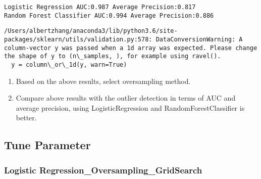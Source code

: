 \documentclass[11pt]{article}
\providecommand{\tightlist}{%
      \setlength{\itemsep}{0pt}\setlength{\parskip}{0pt}}
\begin{document}
    \begin{Verbatim}[commandchars=\\\{\}]
Logistic Regression AUC:0.987 Average Precision:0.817
Random Forest Classifier AUC:0.994 Average Precision:0.886

    \end{Verbatim}

    \begin{Verbatim}[commandchars=\\\{\}]
/Users/albertzhang/anaconda3/lib/python3.6/site-packages/sklearn/utils/validation.py:578: DataConversionWarning: A column-vector y was passed when a 1d array was expected. Please change the shape of y to (n\_samples, ), for example using ravel().
  y = column\_or\_1d(y, warn=True)

    \end{Verbatim}

    \begin{enumerate}
\def\labelenumi{\arabic{enumi}.}
\tightlist
\item
  Based on the above results, select oversampling method.
\item
  Compare above results with the outlier detection in terms of AUC and
  average precision, using LogisticRegression and RandomForestClassifier
  is better.
\end{enumerate}

    \subsection{Tune Parameter}\label{tune-parameter}

    \subsubsection{Logistic
Regression\_Oversampling\_GridSearch}\label{logistic-regression_oversampling_gridsearch}
\end{document}
